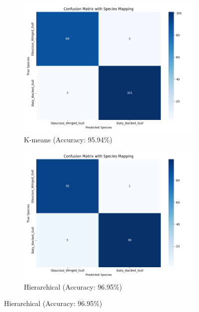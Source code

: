 \documentclass[a4paper,12pt]{report}
\begin{document}
\begin{figure}[H]
    \centering
    \begin{subfigure}[b]{0.32\textwidth}
        \centering
        \includegraphics[width=\textwidth]{images/clustering/kmeans_confusion_matrix.png}
        \caption{K-means (Accuracy: 95.94\%)}
        \label{fig:kmeans_cm}
    \end{subfigure}
    \hfill
    \begin{subfigure}[b]{0.32\textwidth}
        \centering
        \includegraphics[width=\textwidth]{images/clustering/hierarchical_confusion_matrix.png}
        \caption{Hierarchical (Accuracy: 96.95\%)}
        \label{fig:hierarchical_cm}
    \end{subfigure}

\end{figure}
\end{document}
